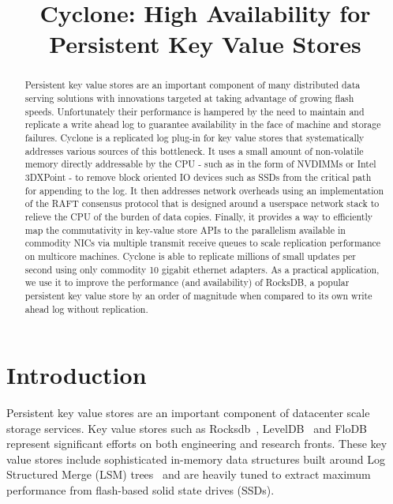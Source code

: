 \documentclass[pageno]{jpaper}
\begin{document}
\title{\Large \bf Cyclone: High Availability for Persistent Key Value Stores}


\date{}
\maketitle

\thispagestyle{empty}

\begin{abstract}
\vspace{0.1in}
Persistent key value stores are an important component of many distributed data
serving solutions with innovations targeted at taking advantage of growing flash
speeds. Unfortunately their performance is hampered by the need to maintain and
replicate a write ahead log to guarantee availability in the face of machine and
storage failures. Cyclone is a replicated log plug-in for key value stores that
systematically addresses various sources of this bottleneck. It uses a small
amount of non-volatile memory directly addressable by the CPU - such as in the
form of NVDIMMs or Intel 3DXPoint - to remove block oriented IO devices such as
SSDs from the critical path for appending to the log. It then addresses network
overheads using an implementation of the RAFT consensus protocol that is
designed around a userspace network stack to relieve the CPU of the burden of
data copies. Finally, it provides a way to efficiently map the commutativity in
key-value store APIs to the parallelism available in commodity NICs via multiple
transmit receive queues to scale replication performance on multicore
machines. Cyclone is able to replicate millions of small updates per second
using only commodity 10 gigabit ethernet adapters. As a practical application,
we use it to improve the performance (and availability) of RocksDB, a popular
persistent key value store by an order of magnitude when compared to its own
write ahead log without replication.
\end{abstract}

\section{Introduction}
Persistent key value stores are an important component of datacenter scale
storage services. Key value stores such as Rocksdb~\cite{rocksdb},
LevelDB~\cite{leveldb} and FloDB~\cite{flodb} represent significant efforts on
both engineering and research fronts. These key value stores include
sophisticated in-memory data structures built around Log Structured Merge (LSM)
trees~\cite{lsmtree} and are heavily tuned to extract maximum performance from
flash-based solid state drives (SSDs).
\end{document}
